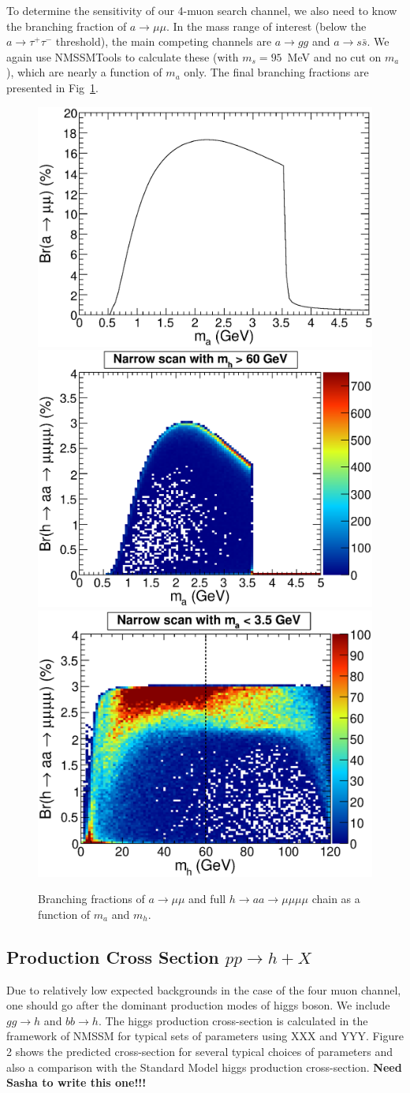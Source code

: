 \documentclass[aps,prd,onecolumn,superscriptaddress,showpacs]{revtex4}
\begin{document}
To determine the sensitivity of our 4-muon search channel, we also
need to know the branching fraction of $a\to\mu\mu$.  In the mass
range of interest (below the $a \to \tau^+\tau^-$ threshold), the main
competing channels are $a \to gg$ and $a \to s\bar{s}$.  We again use
NMSSMTools to calculate these (with $m_s = 95$~MeV and no cut on
$m_a$), which are nearly a function of $m_a$ only.  The final
branching fractions are presented in Fig~\ref{brh4mu_plots}.

\begin{figure}
\begin{center}
\includegraphics[width=0.31\linewidth]{plots/branching_fractions_plot.eps}
\includegraphics[width=0.31\linewidth]{plots/brh4mu_pmass1.eps}
\includegraphics[width=0.31\linewidth]{plots/brh4mu_smass1.eps}
\caption{Branching fractions of $a \to \mu\mu$ and full $h \to aa \to \mu\mu\mu\mu$ chain
  as a function of $m_a$ and $m_h$. \label{brh4mu_plots}}
\end{center}
\end{figure}

\subsection{Production Cross Section $pp \to h + X$ }

Due to relatively low expected backgrounds in the case of the four muon channel,
one should go after the dominant production modes of higgs boson. We include $gg
\to h$ and $bb \to h$. The higgs production cross-section is calculated in the framework of NMSSM
for typical sets of parameters using XXX and YYY. Figure 2 shows the predicted
cross-section for several typical choices of parameters and also a comparison
with the Standard Model higgs production cross-section. {\bf Need Sasha to write this one!!!}
\end{document}
